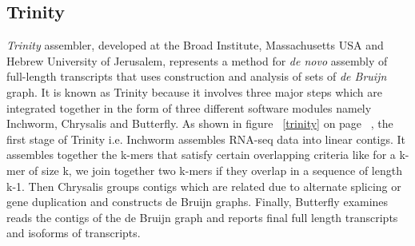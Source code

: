 \label{key}\documentclass[plainarticle, english ,zihtitle,final,hyperref,utf8]{zihpub}
\begin{document}
\subsection{Trinity}
\emph{Trinity} assembler, developed at the Broad Institute, Massachusetts USA and Hebrew University of Jerusalem, represents a method for \emph{de novo} assembly of full-length transcripts that uses construction and analysis of sets of \emph{de Bruijn} graph. It is known as Trinity because it involves three major steps which are integrated together in the form of three different software modules namely Inchworm, Chrysalis and Butterfly. As shown in figure ~\ref{trinity} on page ~\pageref{trinity}, the first stage of Trinity i.e. Inchworm assembles RNA-seq data into linear contigs. It assembles together the k-mers that satisfy certain overlapping criteria like for a k-mer of size k, we join together two k-mers if they overlap in a sequence of length k-1. Then Chrysalis groups contigs which are related due to alternate splicing or gene duplication and constructs de Bruijn graphs. Finally, Butterfly examines reads the contigs of the de Bruijn graph and reports final full length transcripts and isoforms of transcripts.
\end{document}
